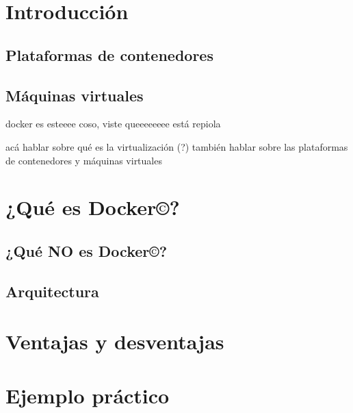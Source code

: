 \documentclass[14pt]{extarticle}
\newcommand{\docker}{Docker\copyright}
\begin{document}
    \clearpage
    \pagestyle{fancy}
    \cfoot{}
    \lfoot{\thepage}

    \clearpage
    \tableofcontents
    \clearpage

    \section{Introducción}
    \subsection{Plataformas de contenedores}
    \subsection{Máquinas virtuales}
    docker es esteeee coso, viste queeeeeeee
    está repiola

    acá hablar sobre qué es la virtualización (?)
    también hablar sobre las plataformas de contenedores
    y máquinas virtuales

    \clearpage
    \section{¿Qué es \docker{}?}
    \subsection{¿Qué \textbf{NO} es \docker{}?}
    \subsection{Arquitectura}

    \clearpage
    \section{Ventajas y desventajas}


    \clearpage
    \section{Ejemplo práctico}


    \clearpage
    
    
\end{document}
